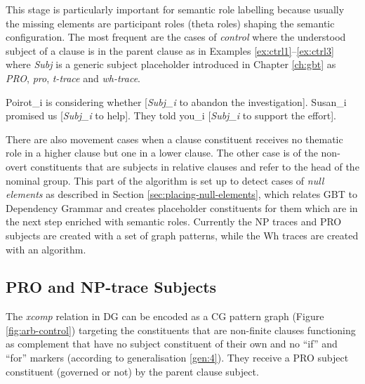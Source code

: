     This stage is particularly important for semantic role labelling because usually the missing elements are participant roles (theta roles) shaping the semantic configuration. The most frequent are the cases of \textit{control} where the understood subject of a clause is in the parent clause as in Examples \ref{ex:ctrl1}--\ref{ex:ctrl3} where \textit{Subj} is a generic subject placeholder introduced in Chapter \ref{ch:gbt} as \textit{PRO}, \textit{pro}, \textit{t-trace} and \textit{wh-trace}.

    \begin{exe}
    	\ex\label{ex:ctrl1}Poirot_i is considering whether [\textit{Subj_i} to abandon the investigation].
    	\ex\label{ex:ctrl2}Susan_i promised us [\textit{Subj_i} to help].
    	\ex\label{ex:ctrl3}They told you_i [\textit{Subj_i} to support the effort].
    \end{exe}

    There are also movement cases when a clause constituent receives no thematic role in a higher clause but one in a lower clause. The other case is of the non-overt constituents that are subjects in relative clauses and refer to the head of the nominal group. This part of the algorithm is set up to detect cases of \textit{null elements} as described in Section \ref{sec:placing-null-elements}, which relates GBT to Dependency Grammar and creates placeholder constituents for them which are in the next step enriched with semantic roles. Currently the NP traces and PRO subjects are created with a set of graph patterns, while the Wh traces are created with an algorithm.

\subsection{PRO and NP-trace Subjects}

    The \textit{xcomp} relation in DG can be encoded as a CG pattern graph (Figure \ref{fig:arb-control}) targeting the constituents that are non-finite clauses functioning as complement that have no subject constituent of their own and no ``if'' and ``for'' markers (according to generalisation \ref{gen:4}). They receive a PRO subject constituent (governed or not) by the parent clause subject.

